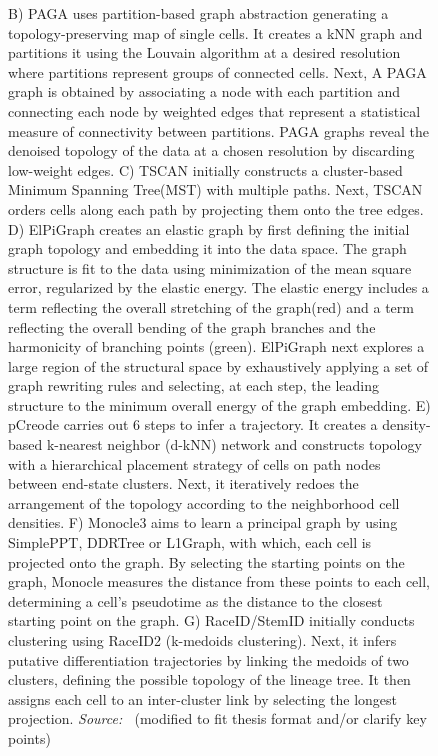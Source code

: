 \begin{figure}[t!]
  \caption[]{
	B) PAGA uses partition-based graph abstraction generating a topology-preserving map of single cells. It creates a kNN graph and partitions it using the Louvain algorithm at a desired resolution where partitions represent groups of connected cells. Next, A PAGA graph is obtained by associating a node with each partition and connecting each node by weighted edges that represent a statistical measure of connectivity between partitions. PAGA graphs reveal the denoised topology of the data at a chosen resolution by discarding low-weight edges.
	C) TSCAN initially constructs a cluster-based Minimum Spanning Tree(MST) with multiple paths. Next, TSCAN orders cells along each path by projecting them onto the tree edges. 
	D) ElPiGraph creates an elastic graph by first defining the initial graph topology and embedding it into the data space. The graph structure is fit to the data using minimization of the mean square error, regularized by the elastic energy. The elastic energy includes a term reflecting the overall stretching of the graph(red) and a term reflecting the overall bending of the graph branches and the harmonicity of branching points (green). ElPiGraph next explores a large region of the structural space by exhaustively applying a set of graph rewriting rules and selecting, at each step, the leading structure to the minimum overall energy of the graph embedding.
	E) pCreode carries out 6 steps to infer a trajectory. It creates a density-based k-nearest neighbor (d-kNN) network and constructs topology with a hierarchical placement strategy of cells on path nodes between end-state clusters. Next, it iteratively redoes the arrangement of the topology according to the neighborhood cell densities.
	F) Monocle3 aims to learn a principal graph by using SimplePPT, DDRTree or L1Graph, with which, each cell is projected onto the graph. By selecting the starting points on the graph, Monocle measures the distance from these points to each cell, determining a cell's pseudotime as the distance to the closest starting point on the graph.
	G) RaceID/StemID initially conducts clustering using RaceID2 (k-medoids clustering). Next, it infers putative differentiation trajectories by linking the medoids of two clusters, defining the possible topology of the lineage tree. It then assigns each cell to an inter-cluster link by selecting the longest projection.
	\emph{Source: ~\cite{chen2019stream, wolf2019paga,ji2016tscan,albergante2020ElPiGraph,herring2018pCreode,street2018slingshot,cao2019monocle3,grun2016stemid}}(modified to fit thesis format and/or clarify key points)}%
\end{figure}

